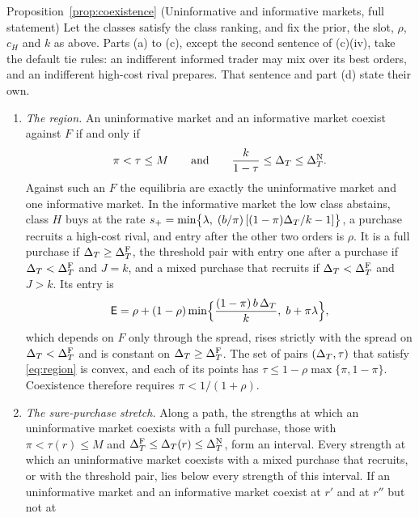 \begin{named}{Proposition~\ref{prop:coexistence} (Uninformative and informative markets, full statement)}
Let the classes satisfy the class ranking, and fix the prior, the slot, \(\rho\), \(c_H\) and \(k\) as above. Parts
(a) to (c), except the second sentence of (c)(iv), take the default tie rules: an indifferent informed trader may mix over
its best orders, and an indifferent high-cost rival prepares. That sentence and part (d) state their own.
\begin{enumerate}[label=(\alph*),leftmargin=2em]
\item \emph{The region.} An uninformative market and an informative market coexist against \(F\) if and only if
\begin{equation}\label{eq:region}
\pi<\tau\le M\qquad\text{and}\qquad \frac{k}{1-\tau}\le\Delta_T\le\Delta_T^{\rm N} .
\end{equation}
Against such an \(F\) the equilibria are exactly the uninformative market and one informative market. In the informative
market the low class abstains, class \(H\) buys at the rate
\(s_+=\min\bigl\{\lambda,\;(b/\pi)\,[(1-\pi)\Delta_T/k-1]\bigr\}\), a purchase recruits a high-cost rival, and entry
after the other two orders is \(\rho\). It is a full purchase if \(\Delta_T\ge\Delta_T^{\rm F}\), the threshold pair with entry
one after a purchase if \(\Delta_T<\Delta_T^{\rm F}\) and \(J=k\), and a mixed purchase that recruits if \(\Delta_T<\Delta_T^{\rm F}\) and
\(J>k\). Its entry is
\begin{equation}\label{eq:entry-inf}
\mathsf{E}=\rho+(1-\rho)\min\Bigl\{\frac{(1-\pi)\,b\,\Delta_T}{k},\;b+\pi\lambda\Bigr\},
\end{equation}
which depends on \(F\) only through the spread, rises strictly with the spread on \(\Delta_T<\Delta_T^{\rm F}\) and is constant
on \(\Delta_T\ge\Delta_T^{\rm F}\). The set of pairs \((\Delta_T,\tau)\) that satisfy \eqref{eq:region} is convex, and each of its
points has \(\tau\le1-\rho\max\{\pi,1-\pi\}\). Coexistence therefore requires \(\pi<1/(1+\rho)\).
\item \emph{The sure-purchase stretch.} Along a path, the strengths at which an uninformative market coexists with a full
purchase, those with \(\pi<\tau(r)\le M\) and \(\Delta_T^{\rm F}\le\Delta_T(r)\le\Delta_T^{\rm N}\), form an interval. Every strength at
which an uninformative market coexists with a mixed purchase that recruits, or with the threshold pair, lies below every
strength of this interval. If an uninformative market and an informative market coexist at \(r'\) and at \(r''\) but not at

\end{enumerate}
\end{named}
